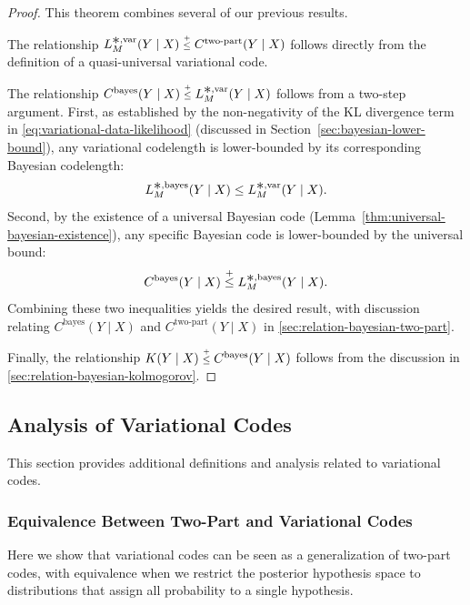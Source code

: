 \begin{proof}
This theorem combines several of our previous results.

The relationship $L_{M}^{\bigast,\text{var}}(Y \mid X) \leqc C^{\text{two-part}}(Y \mid X)$ follows directly from the definition of a quasi-universal variational code.

The relationship $C^{\text{bayes}}(Y \mid X) \leqc L_{M}^{\bigast,\text{var}}(Y \mid X)$ follows from a two-step argument. First, as established by the non-negativity of the KL divergence term in \eqref{eq:variational-data-likelihood} (discussed in Section~\ref{sec:bayesian-lower-bound}), any variational codelength is lower-bounded by its corresponding Bayesian codelength:
\begin{equation*}
    L_{M}^{\bigast,\text{bayes}}(Y \mid X) \leq L_{M}^{\bigast,\text{var}}(Y \mid X).
\end{equation*}
Second, by the existence of a universal Bayesian code (Lemma~\ref{thm:universal-bayesian-existence}), any specific Bayesian code is lower-bounded by the universal bound: 
\begin{equation*}
   C^{\text{bayes}}(Y \mid X) \leqc L_{M}^{\bigast,\text{bayes}}(Y \mid X).
\end{equation*}
Combining these two inequalities yields the desired result, with discussion relating $C^{\text{bayes}}(Y \mid X)$ and $C^{\text{two-part}}(Y \mid X)$ in \ref{sec:relation-bayesian-two-part}.


Finally, the relationship $K(Y \mid X) \leqc C^{\text{bayes}}(Y \mid X)$ follows from the discussion in \ref{sec:relation-bayesian-kolmogorov}. 
\end{proof}

\subsection{Analysis of Variational Codes}

This section provides additional definitions and analysis related to variational codes.


\subsubsection{Equivalence Between Two-Part and Variational Codes}
\label{sec:var-two-part-equivalence}

Here we show that variational codes can be seen as a generalization of two-part codes, with equivalence when we restrict the posterior hypothesis space to distributions that assign all probability to a single hypothesis.

